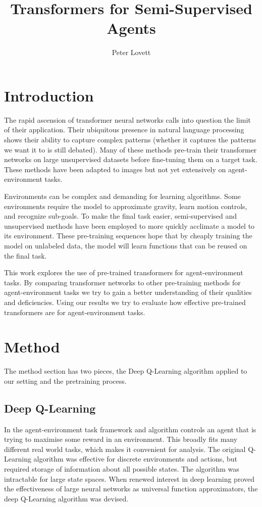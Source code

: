 \documentclass[11pt, twocolumn]{article}
\begin{document}
\title{Transformers for Semi-Supervised Agents}

\author{Peter Lovett}

\maketitle

\section{Introduction}

The rapid ascension of transformer neural networks calls into question the limit of their application. Their ubiquitous presence in natural language processing shows their ability to capture complex patterns (whether it captures the patterns we want it to is still debated). Many of these methods pre-train their transformer networks on large unsupervised datasets before fine-tuning them on a target task. These methods have been adapted to images but not yet extensively on agent-environment tasks.

Environments can be complex and demanding for learning algorithms. Some environments require the model to approximate gravity, learn motion controls, and recognize sub-goals. To make the final task easier, semi-supervised and unsupervised methods have been employed to more quickly acclimate a model to its environment. These pre-training sequences hope that by cheaply training the model on unlabeled data, the model will learn functions that can be reused on the final task.

This work explores the use of pre-trained transformers for agent-environment tasks. By comparing  transformer networks to other pre-training methods for agent-environment tasks we try to gain a better understanding of their qualities and deficiencies. Using our results we try to evaluate how effective pre-trained transformers are for agent-environment tasks.

\section{Method}

The method section has two pieces, the Deep Q-Learning algorithm\cite{mnih2013playing} applied to our setting and the pretraining process. 

\subsection{Deep Q-Learning}
In the agent-environment task framework and algorithm controls an agent that is trying to maximise some reward in an environment. This broadly fits many different real world tasks, which makes it convenient for analysis. The original Q-Learning algorithm \cite{watkins1992q} was effective for discrete environments and actions, but required storage of information about all possible states. The algorithm was intractable for large state spaces. When renewed interest in deep learning proved the effectiveness of large neural networks as universal function approximators, the deep Q-Learning algorithm was devised.
\end{document}

